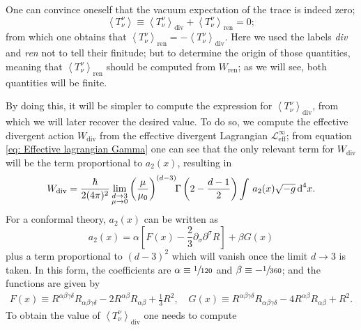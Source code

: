 One can convince oneself that the vacuum expectation of the trace is indeed zero;
\begin{equation}
	\left\langle T^\nu_\nu\right\rangle\equiv \left\langle T^\nu_\nu\right\rangle_{\text{div}}+\left\langle T^\nu_\nu\right\rangle_{\text{ren}}=0;
\end{equation}
from which one obtains that $\left\langle T^\nu_\nu\right\rangle_{\text{ren}}=-\left\langle T^\nu_\nu\right\rangle_{\text{div}}$. Here we used the labels \textit{div} and \textit{ren} not to tell their finitude; but to determine the origin of those quantities, meaning that $\left\langle T^\nu_\nu\right\rangle_{\text{ren}}$ should be computed from $W_{\text{ren}}$; as we will see, both quantities will be finite.

By doing this, it will be simpler to compute the expression for $\left\langle T^\nu_\nu\right\rangle_{\text{div}}$, from which we will later recover the desired value. To do so, we compute the effective divergent action $W_{\text{div}}$ from the effective divergent Lagrangian $\mathcal{L}_{\text{eff}}^\infty$; from equation \ref{eq: Effective lagrangian Gamma} one can see that the only relevant term for $W_{\text{div}}$ will be the term proportional to $a_2(x)$, resulting in
\begin{equation}
	W_{\text{div}}=\frac{\hbar }{2(4\pi)^2}\lim\limits_{\substack{d\to 3 \\ \mu\to 0}}\left(\frac{\mu}{\mu_0}\right)^{(d-3)}\!\!\Gamma\left(2-\frac{d-1}{2}\right)\int\,a_2(x)\sqrt{-g}\,\text{d}^4x.
\end{equation}
For a conformal theory, $a_2(x)$ can be written as
\begin{equation}
	a_2(x)=\alpha\left[F(x)-\frac{2}{3}\partial_\sigma\partial^\sigma R\right]+\beta G(x)
\end{equation}
plus a term proportional to $(d-3)^2$ which will vanish once the limit $d\to 3$ is taken. In this form, the coefficients are $\alpha\equiv\sfrac{1}{120}$ and $\beta\equiv -\sfrac{1}{360}$; and the functions are given by
\begin{subequations}
	\begin{gather}
		F(x)\equiv R^{\alpha\beta\gamma\delta}R_{\alpha\beta\gamma\delta}-2R^{\alpha\beta}R_{\alpha\beta}+\frac{1}{3}R^2,\quad G(x)\equiv R^{\alpha\beta\gamma\delta}R_{\alpha\beta\gamma\delta}-4R^{\alpha\beta}R_{\alpha\beta}+R^2.\tag{\theequation \,\,a,b}
	\end{gather}	
\end{subequations}
To obtain the value of $\left\langle T^\nu_\nu\right\rangle_{\text{div}}$ one needs to compute
